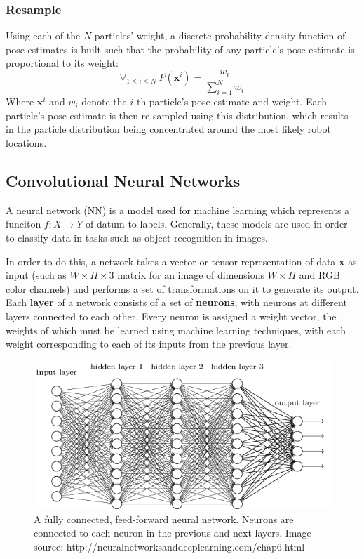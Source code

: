 \documentclass[letterpaper, 12 pt, conference]{ieeeconf}  %
\begin{document}
\subsubsection{Resample} 
Using each of the $N$ particles' weight, a discrete probability density function of pose estimates is built such that the probability of any particle's pose estimate is proportional to its weight: 
$$
\forall _{1\leq i \leq N}~P(\textbf{x}^i)=\frac{w_i}{\sum _{i=1} ^N w_i}
$$
Where $\textbf{x}^i$ and $w_i$ denote the $i$-th particle's pose estimate and weight. Each particle's pose estimate is then re-sampled using this distribution, which results in the particle distribution being concentrated around the most likely robot locations.  

\subsection{Convolutional Neural Networks}

A neural network (NN) is a model used for machine learning which represents a funciton $f:X\to Y$ of datum to labels. Generally, these models are used in order to classify data in tasks such as object recognition in images. 
\par
In order to do this, a network takes a vector or tensor representation of data \textbf{x} as input (such as $W\times H \times 3$ matrix for an image of dimensions $W\times H$ and RGB color channels) and performs a set of transformations on it to generate its output. Each \textbf{layer} of a network consists of a set of \textbf{neurons}, with neurons at different layers connected to each other. Every neuron is assigned a weight vector, the weights of which must be learned using machine learning techniques, with each weight corresponding to each of its inputs from the previous layer.  

\begin{figure}[h]
\centering
\includegraphics[scale=0.43]{neural_net}
\caption{A fully connected, feed-forward neural network. Neurons are connected to each neuron in the previous and next layers. Image source: http://neuralnetworksanddeeplearning.com/chap6.html}
\end{figure}
\end{document}
